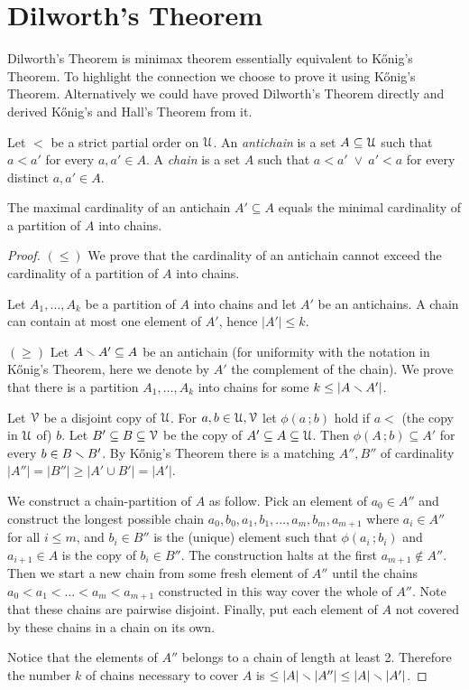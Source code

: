 \documentclass[scombinatorics.tex]{subfiles}
\begin{document}
\section{Dilworth's Theorem}\label{shadow}

Dilworth's Theorem is minimax theorem essentially equivalent to K\H{o}nig's Theorem.
To highlight the connection we choose to prove it using K\H{o}nig's Theorem. 
Alternatively we could have proved Dilworth's Theorem directly and derived K\H{o}nig's and Hall's Theorem from it.

Let $<$ be a strict partial order on $\EuScript U$. An \emph{antichain\/} is a set $A\subseteq\EuScript U$ such that $a<a'$ for every $a,a'\in A$. A \emph{chain\/} is a set $A$ such that $a<a'\;\vee\ a'<a$ for every distinct $a,a'\in A$.

\begin{void_thm}
   The maximal cardinality of an antichain $A'\subseteq A$ equals the minimal cardinality of a partition of $A$ into chains. 
\end{void_thm}

\begin{proof}
   $(\le)$ 
   We prove that the cardinality of an antichain cannot exceed the cardinality of a partition of $A$ into chains.

   Let $A_1,\dots,A_k$ be a partition of $A$ into chains and let $A'$ be an antichains.
   A chain can contain at most one element of $A'$, hence $|A'|\le k$.

   $(\ge)$  
   Let $A\smallsetminus A'\subseteq A$ be an antichain (for uniformity with the notation in K\H{o}nig's Theorem, here we denote by $A'$ the complement of the chain). 
   We prove that there is a partition $A_1,\dots,A_k$ into chains for some $k\le|A\smallsetminus A'|$.

   Let $\EuScript V$ be a disjoint copy of $\EuScript U$.
   For $a,b\in\EuScript U,\EuScript V$ let $\phi(a\,;b)$ hold if  $a<$ (the copy in $\EuScript U$ of) $b$.
   Let $B'\subseteq B\subseteq\EuScript V$ be the copy of $A'\subseteq A\subseteq\EuScript U$.
   Then $\phi(A\,;b)\subseteq A'$ for every $b\in B\smallsetminus B'$.
   By K\H{o}nig's Theorem there is a matching $A'',B''$ of cardinality $|A''|=|B''|\ge|A'\cup B'|=|A'|$.

   We construct a chain-partition of $A$ as follow.
   Pick an element of $a_0\in A''$ and construct the longest possible chain $a_0,b_0,a_1,b_1,\dots,a_m,b_m,a_{m+1}$ where $a_i\in A''$ for all $i\le m$, and $b_i\in B''$ is the (unique) element such that $\phi(a_i\,;b_i)$ and $a_{i+1}\in A$ is the copy of $b_i\in B''$.
   The construction halts at the first $a_{m+1}\not\in A''$.
   Then we start a new chain from some fresh element of $A''$ until the chains $a_0<a_1<\dots<a_m<a_{m+1}$ constructed in this way cover the whole of $A''$.
   Note that these chains are pairwise disjoint.
   Finally, put each element of $A$ not covered by these chains in a chain on its own.
   
   Notice that the elements of $A''$ belongs to a chain of length at least 2.
   Therefore the number $k$ of chains necessary to cover $A$ is $\le |A|\smallsetminus |A''| \le |A|\smallsetminus |A'|$.
\end{proof}
\end{document}
